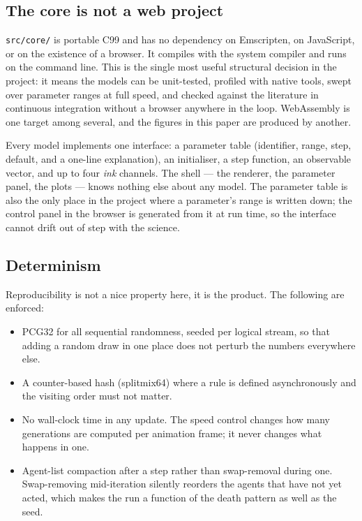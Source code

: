 \documentclass[11pt,a4paper]{article}
\begin{document}
\subsection{The core is not a web project}

\texttt{src/core/} is portable C99 and has no dependency on Emscripten, on
JavaScript, or on the existence of a browser. It compiles with the system
compiler and runs on the command line. This is the single most useful structural
decision in the project: it means the models can be unit-tested, profiled with
native tools, swept over parameter ranges at full speed, and checked against the
literature in continuous integration without a browser anywhere in the loop.
WebAssembly is one target among several, and the figures in this paper are
produced by another.

Every model implements one interface: a parameter table (identifier, range, step,
default, and a one-line explanation), an initialiser, a step function, an
observable vector, and up to four \emph{ink} channels. The shell --- the
renderer, the parameter panel, the plots --- knows nothing else about any model.
The parameter table is also the only place in the project where a parameter's
range is written down; the control panel in the browser is generated from it at
run time, so the interface cannot drift out of step with the science.

\subsection{Determinism}

Reproducibility is not a nice property here, it is the product. The following are
enforced:

\begin{itemize}\setlength{\itemsep}{2pt}
  \item PCG32 \cite{oneill2014pcg} for all sequential randomness, seeded per
    logical stream, so that adding a random draw in one place does not perturb
    the numbers everywhere else.
  \item A counter-based hash (splitmix64) where a rule is defined
    asynchronously and the visiting order must not matter.
  \item No wall-clock time in any update. The speed control changes how many
    generations are computed per animation frame; it never changes what happens
    in one.
  \item Agent-list compaction after a step rather than swap-removal during one.
    Swap-removing mid-iteration silently reorders the agents that have not yet
    acted, which makes the run a function of the death pattern as well as the
    seed.
\end{itemize}
\end{document}
